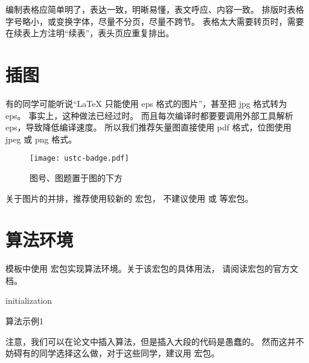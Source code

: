 编制表格应简单明了，表达一致，明晰易懂，表文呼应、内容一致。
排版时表格字号略小，或变换字体，尽量不分页，尽量不跨节。
表格太大需要转页时，需要在续表上方注明“续表”，表头页应重复排出。



\section{插图}

有的同学可能听说“\LaTeX{} 只能使用 eps 格式的图片”，甚至把 jpg 格式转为 eps。
事实上，这种做法已经过时。
而且每次编译时都要要调用外部工具解析 eps，导致降低编译速度。
所以我们推荐矢量图直接使用 pdf 格式，位图使用 jpeg 或 png 格式。

\begin{figure}[ht]
  \centering
  \texttt{[image: ustc-badge.pdf]}
  \caption{图号、图题置于图的下方}
  \label{fig:badge}
\end{figure}

关于图片的并排，推荐使用较新的  宏包，
不建议使用  或  等宏包。



\section{算法环境}

模板中使用  宏包实现算法环境。关于该宏包的具体用法，
请阅读宏包的官方文档。

\begin{algorithm}
  \SetAlgoLined

  initialization\;
  \caption{算法示例1}
  \label{algo:algorithm1}
\end{algorithm}

注意，我们可以在论文中插入算法，但是插入大段的代码是愚蠢的。
然而这并不妨碍有的同学选择这么做，对于这些同学，建议用  宏包。
